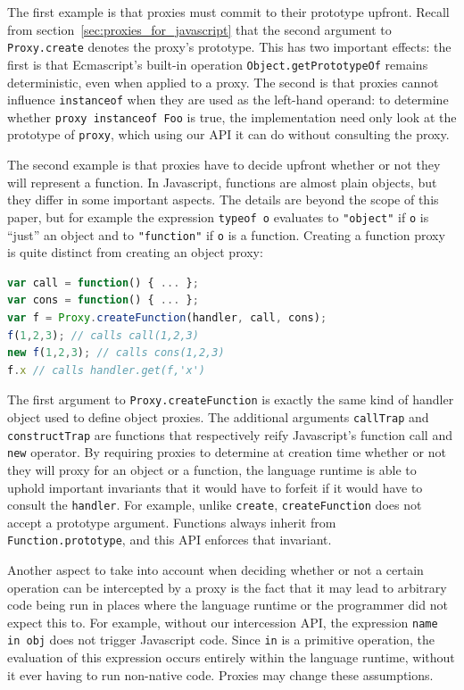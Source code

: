 \documentclass{acm_proc_article-sp}
\begin{document}
The first example is that proxies must commit to their prototype upfront. Recall from section~\ref{sec:proxies_for_javascript} that the second argument to \texttt{Proxy.create} denotes the proxy's prototype. This has two important effects: the first is that Ecmascript's built-in operation \texttt{Object.getPrototypeOf} remains deterministic, even when applied to a proxy. The second is that proxies cannot influence \texttt{instanceof} when they are used as the left-hand operand: to determine whether \texttt{proxy instanceof Foo} is true, the implementation need only look at the prototype of \texttt{proxy}, which using our API it can do without consulting the proxy.

The second example is that proxies have to decide upfront whether or not they will represent a function. In Javascript, functions are almost plain objects, but they differ in some important aspects. The details are beyond the scope of this paper, but for example the expression \texttt{typeof o} evaluates to \texttt{"object"} if \texttt{o} is ``just'' an object and to \texttt{"function"} if \texttt{o} is a function. Creating a function proxy is quite distinct from creating an object proxy:

\begin{lstlisting}[language=javascript]
var call = function() { ... };
var cons = function() { ... };
var f = Proxy.createFunction(handler, call, cons);
f(1,2,3); // calls call(1,2,3)
new f(1,2,3); // calls cons(1,2,3)
f.x // calls handler.get(f,'x')
\end{lstlisting}

The first argument to \texttt{Proxy.createFunction} is exactly the same kind of handler object used to define object proxies. The additional arguments \texttt{callTrap} and \texttt{constructTrap} are functions that respectively reify Javascript's function call and \texttt{new} operator. By requiring proxies to determine at creation time whether or not they will proxy for an object or a function, the language runtime is able to uphold important invariants that it would have to forfeit if it would have to consult the \texttt{handler}. For example, unlike \texttt{create}, \texttt{createFunction} does not accept a prototype argument. Functions always inherit from \texttt{Function.prototype}, and this API enforces that invariant.

Another aspect to take into account when deciding whether or not a certain operation can be intercepted by a proxy is the fact that it may lead to arbitrary code being run in places where the language runtime or the programmer did not expect this to. For example, without our intercession API, the expression \texttt{name in obj} does not trigger Javascript code. Since \texttt{in} is a primitive operation, the evaluation of this expression occurs entirely within the language runtime, without it ever having to run non-native code. Proxies may change these assumptions.
\end{document}
